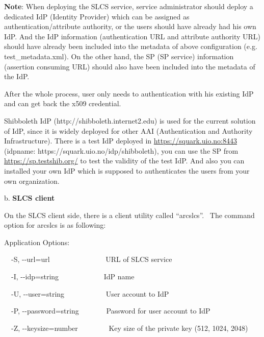 \documentclass{article}
\begin{document}
{\color{black}
\textbf{Note}: When deploying the SLCS service, service administrator
should deploy a dedicated IdP (Identity Provider) which can be assigned
as authentication/attribute authority, or the users should have already
had his own IdP. And the IdP information (authentication URL and
attribute authority URL) should have already been included into the
metadata of above configuration (e.g. test\_metadata.xml). On the other
hand, the SP (SP service) information (assertion consuming URL) should
also have been included into the metadata of the IdP.}

{\color{black}
After the whole process, user only needs to authentication with his
existing IdP and can get back the x509 credential.}

{\color{black}
Shibboleth IdP (http://shibboleth.internet2.edu) is used for the current
solution of IdP, since it is widely deployed for other AAI
(Authentication and Authority Infrastructure). There is a test IdP
deployed in
\href{https://squark.uio.no:8443/}{https://squark.uio.no:8443}
(idpname: https://squark.uio.no/idp/shibboleth), you can use the SP
from \url{https://sp.testshib.org/} to test the validity of the test
IdP. And also you can installed your own IdP which is supposed to
authenticates the users from your own organization.}

{\color{black}
b. \textbf{SLCS client}}

{\color{black}
On the SLCS client side, there is a client utility called
{\textquotedblleft}arcslcs{\textquotedblright}. \ The command option
for arcslcs is as following:}

{\color{black}
Application Options: }

{\color{black}
\ \ {}-S, -{}-url=url \ \ \ \ \ \ \ \ \ \ \ \ \ \ \ URL of SLCS service
}

{\color{black}
\ \ {}-I, -{}-idp=string \ \ \ \ \ \ \ \ \ \ \ \ IdP name }

{\color{black}
\ \ {}-U, -{}-user=string \ \ \ \ \ \ \ \ \ \ \ User account to IdP }

{\color{black}
\ \ {}-P, -{}-password=string \ \ \ \ \ \ \ Password for user account to
IdP }

{\color{black}
\ \ {}-Z, -{}-keysize=number \ \ \ \ \ \ \ \ Key size of the private key
(512, 1024, 2048) }
\end{document}
